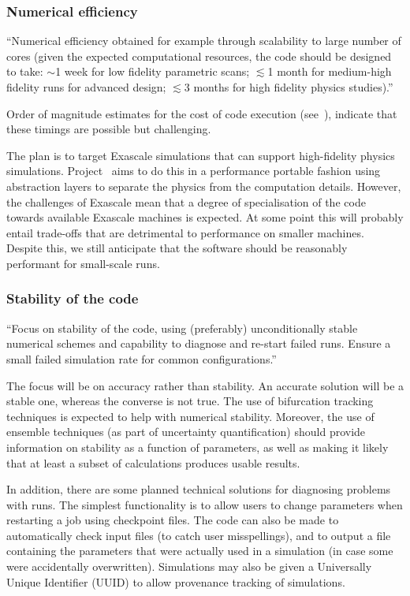 \subsubsection{Numerical efficiency}

``Numerical efficiency obtained for example through scalability to
large number of cores (given the expected computational resources, the
code should be designed to take: $\sim$1 week for low fidelity
parametric scans; $\lesssim$1 month for medium-high fidelity runs for
advanced design; $\lesssim$3 months for high fidelity physics studies).''

Order of magnitude estimates for the cost of code execution (see~),
indicate that these timings are possible but challenging.

The plan is to target Exascale simulations that can support high-fidelity physics
simulations.
Project \nep \ aims to do this in a performance portable fashion using abstraction
layers to separate the physics from the computation details.
However, the challenges of Exascale mean that a degree of
specialisation of the code towards available Exascale machines is expected.
At some point this will probably entail trade-offs that are detrimental to
performance on smaller machines.
Despite this, we still anticipate that the software
should be reasonably performant for small-scale runs.

\subsubsection{Stability of the code}

``Focus on stability of the code, using (preferably) unconditionally
stable numerical schemes and capability to diagnose and re-start failed runs.
Ensure a small failed simulation rate for common configurations.''

The focus will be on accuracy rather than stability.
An accurate solution will be a stable one, whereas the converse is not true.
The use of bifurcation tracking techniques is expected to help with numerical
stability. 
Moreover, the use of ensemble techniques (as part of uncertainty quantification)
should provide information on stability as a function of parameters, as well as
making it likely that at least a subset of calculations produces usable
results.

In addition, there are some planned technical solutions for diagnosing problems
with runs.
The simplest functionality is to allow users to change parameters when
restarting a job using checkpoint files.
The code can also be made to automatically check input files (to catch user
misspellings), and to output a file containing the parameters that were
actually used in a simulation (in case some were accidentally overwritten).
Simulations may also be given a Universally Unique Identifier (UUID) to allow
provenance tracking of simulations.


